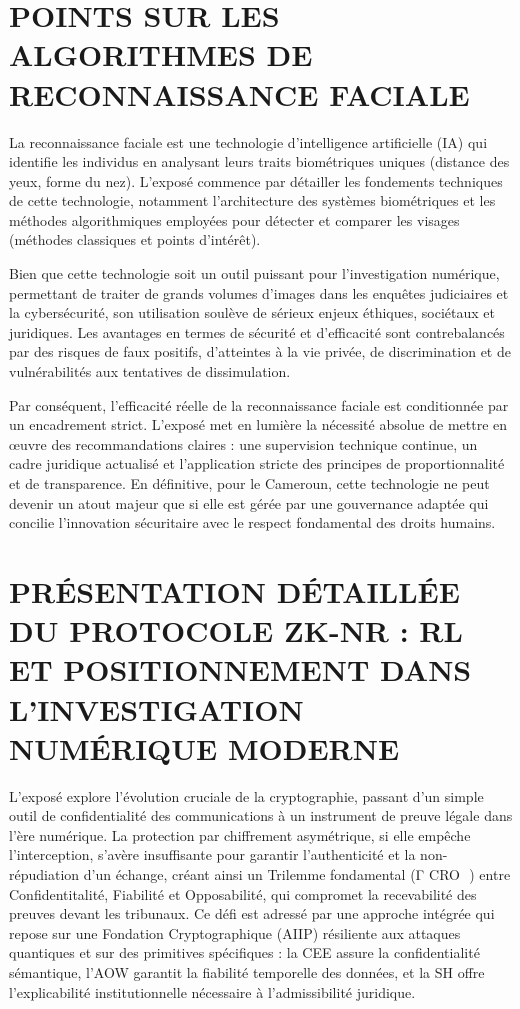 \documentclass[12pt, openany]{report}
\begin{document}
\newpage
\tableofcontents
\newpage
\section{POINTS SUR LES ALGORITHMES DE RECONNAISSANCE FACIALE}
La reconnaissance faciale est une technologie d'intelligence artificielle (IA) qui identifie les individus en analysant leurs traits biométriques uniques (distance des yeux, forme du nez). L'exposé commence par détailler les fondements techniques de cette technologie, notamment l'architecture des systèmes biométriques et les méthodes algorithmiques employées pour détecter et comparer les visages (méthodes classiques et points d'intérêt).

Bien que cette technologie soit un outil puissant pour l'investigation numérique, permettant de traiter de grands volumes d'images dans les enquêtes judiciaires et la cybersécurité, son utilisation soulève de sérieux enjeux éthiques, sociétaux et juridiques. Les avantages en termes de sécurité et d'efficacité sont contrebalancés par des risques de faux positifs, d'atteintes à la vie privée, de discrimination et de vulnérabilités aux tentatives de dissimulation.

Par conséquent, l'efficacité réelle de la reconnaissance faciale est conditionnée par un encadrement strict. L'exposé met en lumière la nécessité absolue de mettre en œuvre des recommandations claires : une supervision technique continue, un cadre juridique actualisé et l'application stricte des principes de proportionnalité et de transparence. En définitive, pour le Cameroun, cette technologie ne peut devenir un atout majeur que si elle est gérée par une gouvernance adaptée qui concilie l'innovation sécuritaire avec le respect fondamental des droits humains.

\newpage
\section{PRÉSENTATION DÉTAILLÉE DU PROTOCOLE ZK-NR : RL ET
POSITIONNEMENT DANS L’INVESTIGATION NUMÉRIQUE
MODERNE}
L'exposé explore l'évolution cruciale de la cryptographie, passant d'un simple outil de confidentialité des communications à un instrument de preuve légale dans l'ère numérique. La protection par chiffrement asymétrique, si elle empêche l'interception, s'avère insuffisante pour garantir l'authenticité et la non-répudiation d'un échange, créant ainsi un Trilemme fondamental (Γ 
CRO
​
 ) entre Confidentitalité, Fiabilité et Opposabilité, qui compromet la recevabilité des preuves devant les tribunaux. Ce défi est adressé par une approche intégrée qui repose sur une Fondation Cryptographique (AIIP) résiliente aux attaques quantiques et sur des primitives spécifiques : la CEE assure la confidentialité sémantique, l'AOW garantit la fiabilité temporelle des données, et la SH offre l'explicabilité institutionnelle nécessaire à l'admissibilité juridique.
\end{document}
